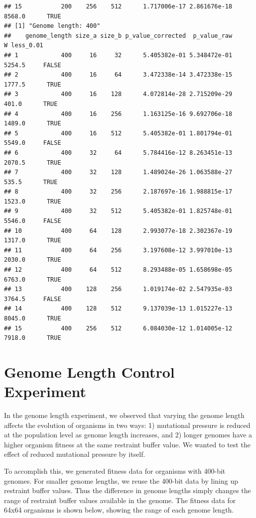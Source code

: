 \documentclass[
]{book}
\begin{document}
\begin{verbatim}
## 15           200    256    512      1.717006e-17 2.861676e-18 8568.0      TRUE
## [1] "Genome length: 400"
##    genome_length size_a size_b p_value_corrected  p_value_raw      W less_0.01
## 1            400     16     32      5.405382e-01 5.348472e-01 5254.5     FALSE
## 2            400     16     64      3.472338e-14 3.472338e-15 1777.5      TRUE
## 3            400     16    128      4.072814e-28 2.715209e-29  401.0      TRUE
## 4            400     16    256      1.163125e-16 9.692706e-18 1489.0      TRUE
## 5            400     16    512      5.405382e-01 1.801794e-01 5549.0     FALSE
## 6            400     32     64      5.784416e-12 8.263451e-13 2070.5      TRUE
## 7            400     32    128      1.489024e-26 1.063588e-27  535.5      TRUE
## 8            400     32    256      2.187697e-16 1.988815e-17 1523.0      TRUE
## 9            400     32    512      5.405382e-01 1.825748e-01 5546.0     FALSE
## 10           400     64    128      2.993077e-18 2.302367e-19 1317.0      TRUE
## 11           400     64    256      3.197608e-12 3.997010e-13 2030.0      TRUE
## 12           400     64    512      8.293488e-05 1.658698e-05 6763.0      TRUE
## 13           400    128    256      1.019174e-02 2.547935e-03 3764.5     FALSE
## 14           400    128    512      9.137039e-13 1.015227e-13 8045.0      TRUE
## 15           400    256    512      6.084030e-12 1.014005e-12 7918.0      TRUE
\end{verbatim}

\hypertarget{genome-length-control-experiment}{%
\chapter{Genome Length Control Experiment}\label{genome-length-control-experiment}}

In the genome length experiment, we observed that varying the genome length affects the evolution of organisms in two ways:
1) mutational pressure is reduced at the population level as genome length increases, and
2) longer genomes have a higher organism fitness at the same restraint buffer value.
We wanted to test the effect of reduced mutational pressure by itself.

To accomplish this, we generated fitness data for organisms with 400-bit genomes.
For smaller genome lengths, we reuse the 400-bit data by lining up restraint buffer values.
Thus the difference in genome lengths simply changes the range of restraint buffer values available in the genome.
The fitness data for 64x64 organisms is shown below, showing the range of each genome length.
\end{document}
